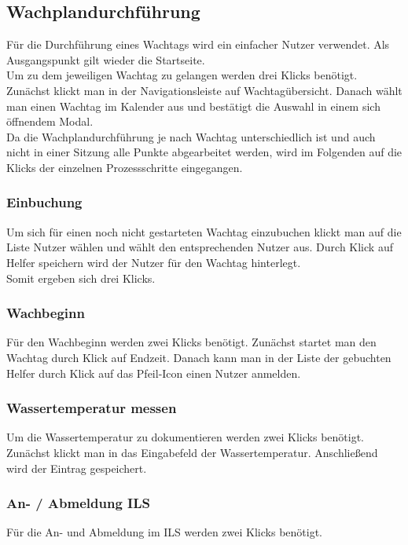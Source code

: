 \documentclass[fontsize=12pt,openright,oneside,paper=a4,BCOR=1cm]{scrbook}
\begin{document}
\subsection{Wachplandurchführung}
Für die Durchführung eines Wachtags wird ein einfacher Nutzer verwendet. Als Ausgangspunkt gilt wieder die Startseite. \\
Um zu dem jeweiligen Wachtag zu gelangen werden drei Klicks benötigt. Zunächst klickt man in der Navigationsleiste auf \glqq Wachtagübersicht\grqq{}. Danach wählt man einen Wachtag im Kalender aus und bestätigt die Auswahl in einem sich öffnendem Modal. \\

Da die Wachplandurchführung je nach Wachtag unterschiedlich ist und auch nicht in einer Sitzung alle Punkte abgearbeitet werden, wird im Folgenden auf die Klicks der einzelnen Prozessschritte eingegangen.

\subsubsection{Einbuchung}
Um sich für einen noch nicht gestarteten Wachtag einzubuchen klickt man auf die Liste \glqq Nutzer wählen\grqq{} und wählt den entsprechenden Nutzer aus. Durch Klick auf \glqq Helfer speichern\grqq{} wird der Nutzer für den Wachtag hinterlegt. \\
Somit ergeben sich drei Klicks.

\subsubsection{Wachbeginn}
Für den Wachbeginn werden zwei Klicks benötigt. Zunächst startet man den Wachtag durch Klick auf \glqq Endzeit. Danach kann man in der Liste der gebuchten Helfer durch Klick auf das Pfeil-Icon einen Nutzer anmelden.

\subsubsection{Wassertemperatur messen}
Um die Wassertemperatur zu dokumentieren werden zwei Klicks benötigt. Zunächst klickt man in das Eingabefeld der Wassertemperatur. Anschließend wird der Eintrag gespeichert.

\subsubsection{An- / Abmeldung ILS}
Für die An- und Abmeldung im ILS werden zwei Klicks benötigt.
\end{document}
